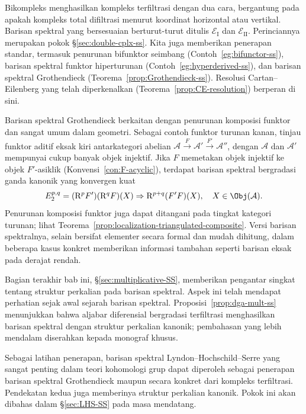 Bikompleks menghasilkan kompleks terfiltrasi dengan dua cara, bergantung pada
apakah kompleks total difiltrasi menurut koordinat horizontal atau vertikal.
Barisan spektral yang bersesuaian berturut-turut ditulis
$\mathscr{E}_{\mathrm{I}}$ dan $\mathscr{E}_{\mathrm{II}}$. Perinciannya
merupakan pokok \S\ref{sec:double-cplx-ss}. Kita juga memberikan penerapan
standar, termasuk penurunan bifunktor seimbang
(Contoh~\ref{eg:bifunctor-ss}), barisan spektral funktor hiperturunan
(Contoh~\ref{eg:hyperderived-ss}), dan barisan spektral Grothendieck
(Teorema~\ref{prop:Grothendieck-ss}). Resolusi Cartan--Eilenberg yang telah
diperkenalkan (Teorema~\ref{prop:CE-resolution}) berperan di sini.

Barisan spektral Grothendieck berkaitan dengan penurunan komposisi funktor dan
sangat umum dalam geometri. Sebagai contoh funktor turunan kanan, tinjau
funktor aditif eksak kiri antarkategori abelian
$\mathcal{A}\xrightarrow{F}\mathcal{A}'\xrightarrow{F'}\mathcal{A}''$,
dengan $\mathcal{A}$ dan $\mathcal{A}'$ mempunyai cukup banyak objek
injektif. Jika $F$ memetakan objek injektif ke objek $F'$-asiklik
(Konvensi~\ref{con:F-acyclic}), terdapat barisan spektral bergradasi ganda
kanonik yang konvergen kuat
\[ E_2^{p, q} = (\mathrm{R}^p F') (\mathrm{R}^q F)(X) \Rightarrow \mathrm{R}^{p+q}(F' F)(X), \quad X \in \Obj(\mathcal{A}). \]
Penurunan komposisi funktor juga dapat ditangani pada tingkat kategori turunan;
lihat Teorema~\ref{prop:localization-triangulated-composite}. Versi barisan
spektralnya, selain bersifat elementer secara formal dan mudah dihitung, dalam
beberapa kasus konkret memberikan informasi tambahan seperti barisan eksak
pada derajat rendah.

Bagian terakhir bab ini, \S\ref{sec:multiplicative-SS}, memberikan pengantar
singkat tentang struktur perkalian pada barisan spektral. Aspek ini telah
mendapat perhatian sejak awal sejarah barisan spektral.
Proposisi~\ref{prop:dga-mult-ss} menunjukkan bahwa aljabar diferensial
bergradasi terfiltrasi menghasilkan barisan spektral dengan struktur perkalian
kanonik; pembahasan yang lebih mendalam diserahkan kepada monograf khusus.

Sebagai latihan penerapan, barisan spektral Lyndon--Hochschild--Serre yang
sangat penting dalam teori kohomologi grup dapat diperoleh sebagai penerapan
barisan spektral Grothendieck maupun secara konkret dari kompleks terfiltrasi.
Pendekatan kedua juga memberinya struktur perkalian kanonik. Pokok ini akan
dibahas dalam \S\ref{sec:LHS-SS} pada masa mendatang.

